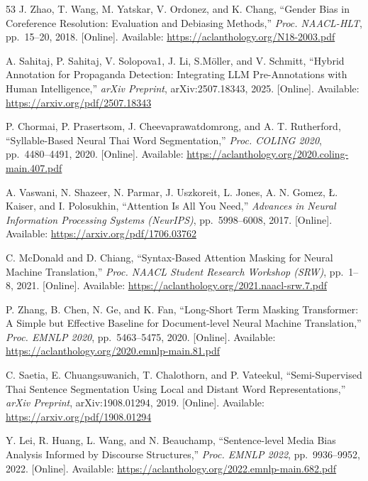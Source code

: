 \documentclass[12pt,oneside,openright,a4paper]{cpe-english-project}
\begin{document}
\begin{thebibliography}{53}
\hypertarget{bib:ref33}{} J. Zhao, T. Wang, M. Yatskar, V. Ordonez, and K. Chang,
``Gender Bias in Coreference Resolution: Evaluation and Debiasing
Methods,'' \emph{Proc. NAACL-HLT}, pp.~15--20, 2018. {[}Online{]}.
Available: \url{https://aclanthology.org/N18-2003.pdf}

\hypertarget{bib:ref34}{} A. Sahitaj, P. Sahitaj, V. Solopova1, J. Li, S.Möller, and V.
Schmitt, ``Hybrid Annotation for Propaganda Detection: Integrating LLM
Pre-Annotations with Human Intelligence,'' \emph{arXiv Preprint},
arXiv:2507.18343, 2025. {[}Online{]}. Available:
\url{https://arxiv.org/pdf/2507.18343}

\hypertarget{bib:ref35}{} P. Chormai, P. Prasertsom, J. Cheevaprawatdomrong, and A. T.
Rutherford, ``Syllable-Based Neural Thai Word Segmentation,''
\emph{Proc. COLING 2020}, pp.~4480--4491, 2020. {[}Online{]}. Available:
\url{https://aclanthology.org/2020.coling-main.407.pdf}

\hypertarget{bib:ref36}{} A. Vaswani, N. Shazeer, N. Parmar, J. Uszkoreit, L. Jones, A.
N. Gomez, Ł. Kaiser, and I. Polosukhin, ``Attention Is All You Need,''
\emph{Advances in Neural Information Processing Systems (NeurIPS)},
pp.~5998--6008, 2017. {[}Online{]}. Available:
\url{https://arxiv.org/pdf/1706.03762}

\hypertarget{bib:ref37}{} C. McDonald and D. Chiang, ``Syntax-Based Attention Masking for
Neural Machine Translation,'' \emph{Proc. NAACL Student Research
Workshop (SRW)}, pp.~1--8, 2021. {[}Online{]}. Available:
\url{https://aclanthology.org/2021.naacl-srw.7.pdf}

\hypertarget{bib:ref38}{} P. Zhang, B. Chen, N. Ge, and K. Fan, ``Long-Short Term Masking
Transformer: A Simple but Effective Baseline for Document-level Neural
Machine Translation,'' \emph{Proc. EMNLP 2020}, pp.~5463--5475, 2020.
{[}Online{]}. Available:
\url{https://aclanthology.org/2020.emnlp-main.81.pdf}

\hypertarget{bib:ref39}{} C. Saetia, E. Chuangsuwanich, T. Chalothorn, and P. Vateekul,
``Semi-Supervised Thai Sentence Segmentation Using Local and Distant
Word Representations,'' \emph{arXiv Preprint}, arXiv:1908.01294, 2019.
{[}Online{]}. Available: \url{https://arxiv.org/pdf/1908.01294}

\hypertarget{bib:ref40}{} Y. Lei, R. Huang, L. Wang, and N. Beauchamp, ``Sentence-level
Media Bias Analysis Informed by Discourse Structures,'' \emph{Proc.
EMNLP 2022}, pp.~9936--9952, 2022. {[}Online{]}. Available:
\url{https://aclanthology.org/2022.emnlp-main.682.pdf}


\end{thebibliography}
\end{document}
